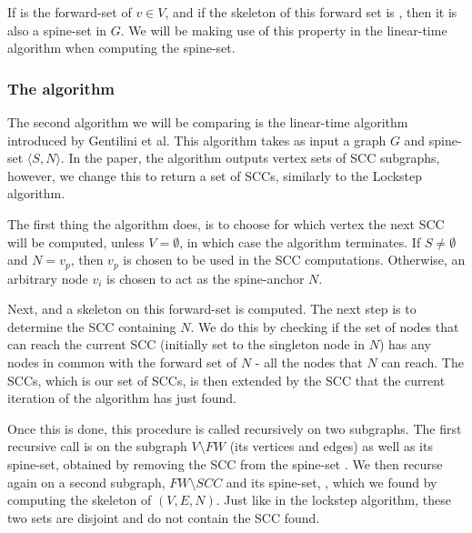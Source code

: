 \documentclass[../master/master.tex]{subfiles}
\begin{document}
If  is the forward-set of $v \in V$, and if the skeleton of this forward set is , then it is also a spine-set in $G$. We will be making use of this property in the linear-time algorithm when computing the spine-set.

\subsubsection{The algorithm}
The second algorithm we will be comparing is the linear-time algorithm \cite{linear} introduced by Gentilini et al. This algorithm takes as input a graph $G$ and spine-set $\langle S, N\rangle$. In the paper, the algorithm outputs vertex sets of SCC subgraphs, however, we change this to return a set of SCCs, similarly to the Lockstep algorithm.

The first thing the algorithm does, is to choose for which vertex the next SCC will be computed, unless $V=\emptyset$, in which case the algorithm terminates. If $S\neq\emptyset$ and $N={v_p}$, then $v_p$ is chosen to be used in the SCC computations. Otherwise, an arbitrary node $v_i$ is chosen to act as the spine-anchor $N$.

Next,  and a skeleton  on this forward-set is computed. The next step is to determine the SCC containing $N$. We do this by checking if the set of nodes that can reach the current SCC (initially set to the singleton node in $N$) has any nodes in common with the forward set of $N$ - all the nodes that $N$ can reach. The SCCs, which is our set of SCCs, is then extended by the SCC that the current iteration of the algorithm has just found.

Once this is done, this procedure is called recursively on two subgraphs. The first recursive call is on the subgraph $V\setminus FW$ (its vertices and edges) as well as its spine-set, obtained by removing the SCC from the spine-set . We then recurse again on a second subgraph, $FW\setminus SCC$ and its spine-set, , which we found by computing the skeleton of $(V, E, N)$. Just like in the lockstep algorithm, these two sets are disjoint and do not contain the SCC found.
\end{document}
